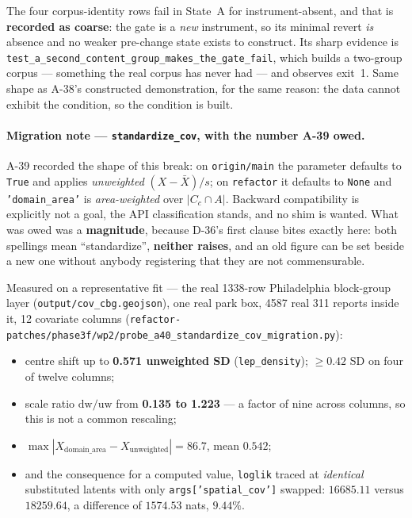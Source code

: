 \documentclass[
  10pt,
]{article}
\providecommand{\tightlist}{%
  \setlength{\itemsep}{0pt}\setlength{\parskip}{0pt}}
\begin{document}
The four corpus-identity rows fail in State~A for instrument-absent, and that is \textbf{recorded as coarse}: the gate is a \emph{new} instrument, so its minimal revert \emph{is} absence and no weaker pre-change state exists to construct. Its sharp evidence is \texttt{test\_a\_second\_content\_group\_makes\_the\_gate\_fail}, which builds a two-group corpus --- something the real corpus has never had --- and observes exit~1. Same shape as A-38's constructed demonstration, for the same reason: the data cannot exhibit the condition, so the condition is built.

\paragraph{Migration note --- \texttt{standardize\_cov}, with the number A-39 owed.}
A-39 recorded the shape of this break: on \texttt{origin/main} the parameter defaults to \texttt{True} and applies \emph{unweighted} \((X-\bar X)/s\); on \texttt{refactor} it defaults to \texttt{None} and \texttt{'domain\_area'} is \emph{area-weighted} over \(|C_c \cap A|\). Backward compatibility is explicitly not a goal, the API classification stands, and no shim is wanted. What was owed was a \textbf{magnitude}, because D-36's first clause bites exactly here: both spellings mean ``standardize'', \textbf{neither raises}, and an old figure can be set beside a new one without anybody registering that they are not commensurable.

Measured on a representative fit --- the real 1338-row Philadelphia block-group layer (\texttt{output/cov\_cbg.geojson}), one real park box, 4587 real 311 reports inside it, 12 covariate columns (\texttt{refactor-patches/\allowbreak{}phase3f/wp2/\allowbreak{}probe\_a40\_standardize\_cov\_migration.py}):

\begin{itemize}
\tightlist
\item centre shift up to \textbf{0.571 unweighted SD} (\texttt{lep\_density}); \(\ge 0.42\) SD on four of twelve columns;
\item scale ratio \(\mathrm{dw}/\mathrm{uw}\) from \textbf{0.135 to 1.223} --- a factor of nine across columns, so this is not a common rescaling;
\item \(\max |X_{\mathrm{domain\_area}} - X_{\mathrm{unweighted}}| = \mathbf{86.7}\), mean \(\mathbf{0.542}\);
\item and the consequence for a computed value, \texttt{loglik} traced at \emph{identical} substituted latents with only \texttt{args['spatial\_cov']} swapped: \(\mathbf{16685.11}\) versus \(\mathbf{18259.64}\), a difference of \(\mathbf{1574.53}\) nats, \(\mathbf{9.44\%}\).
\end{itemize}
\end{document}
